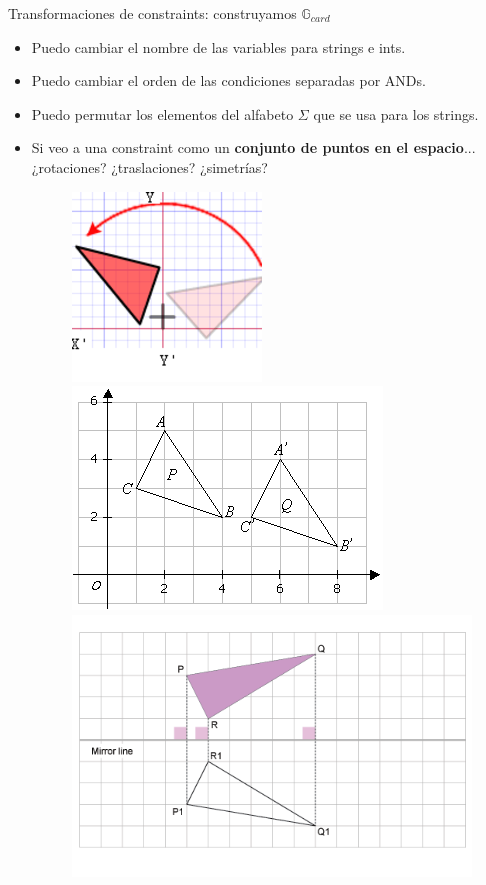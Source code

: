 \documentclass[10pt]{beamer}
\begin{document}
\begin{frame}{Transformaciones de constraints: construyamos $\mathbb{G}_{card}$}
\begin{itemize}
	\item Puedo cambiar el nombre de las variables para strings e ints.
	\item Puedo cambiar el orden de las condiciones separadas por ANDs.
	\item Puedo permutar los elementos del alfabeto $\Sigma$ que se usa para los strings.\pause
	\item Si veo a una constraint como un \textbf{conjunto de puntos en el espacio}...\\¿rotaciones? ¿traslaciones? ¿simetrías?


\begin{figure}[H]
\centering
    \includegraphics[scale=0.3]{rotation.png}
    \includegraphics[scale=0.3]{traslation.png}
    \includegraphics[scale=0.3]{symmetry.png}
    \captionsetup{labelformat=empty}
\end{figure} \pause


\end{itemize}
\end{frame}
\end{document}
